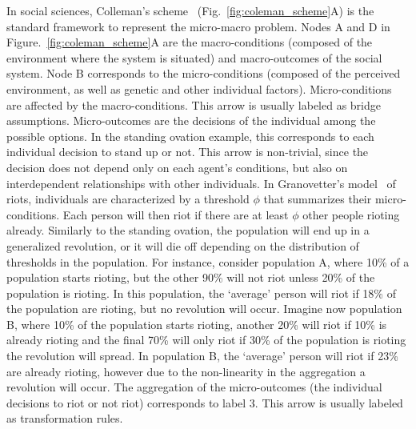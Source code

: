 In social sciences, Colleman’s scheme~\citep{coleman1990} (Fig.~\ref{fig:coleman_scheme}A) is the standard framework to represent the micro-macro problem.
Nodes A and D in Figure.~\ref{fig:coleman_scheme}A are the macro-conditions (composed of the environment where the system is situated) and macro-outcomes of the social system. 
Node B corresponds to the micro-conditions (composed of the perceived environment, as well as genetic and other individual factors). 
Micro-conditions are affected by the macro-conditions. 
This arrow is usually labeled as bridge assumptions.
Micro-outcomes are the decisions of the individual among the possible options. 
In the standing ovation example, this corresponds to each individual decision to stand up or not. 
This arrow is non-trivial, since the decision does not depend only on each agent's conditions, 
but also on interdependent relationships with other individuals.
In Granovetter's model~\cite{granovetter1978} of riots, individuals are characterized by a threshold $\phi$ that summarizes their micro-conditions. 
Each person will then riot if there are at least $\phi$ other people rioting already.
Similarly to the standing ovation, the population will end up in a generalized revolution, 
or it will die off depending on the distribution of thresholds in the population. 
For instance, consider population A, where 10\% of a population starts rioting, but the other 90\% will not riot unless 20\% of the population is rioting.
In this population, the `average' person will riot if 18\% of the population are rioting, but no revolution will occur.
Imagine now population B, where 10\% of the population starts rioting, another 20\% will riot if 10\% is already rioting and the final 70\% will only riot if 30\% of the population is rioting the revolution will spread. 
In population B, the `average' person will riot if 23\% are already rioting, however due to the non-linearity in the aggregation a revolution will occur.
The aggregation of the micro-outcomes (the individual decisions to riot or not riot) corresponds to label 3. This arrow is usually labeled as transformation rules.


